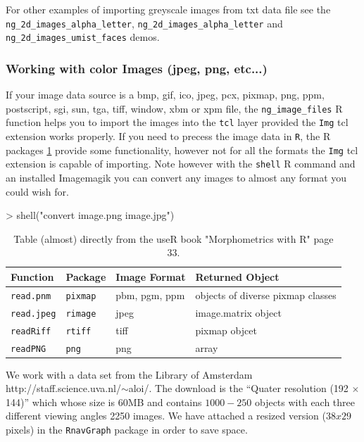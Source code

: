 \documentclass[12pt,oneside,titlepage,letter]{article}
\newcommand{\modify}[1]{{\color{blue}#1}}
\begin{document}
For other examples of importing greyscale images from txt data file see the \texttt{ng\_2d\_images\_alpha\_letter}, \texttt{ng\_2d\_images\_alpha\_letter} and \texttt{ng\_2d\_images\_umist\_faces} demos.


\subsubsection{Working with color Images (jpeg, png, etc...)}

If your image data source is a bmp, gif, ico, jpeg, pcx, pixmap, png, ppm, postscript, sgi, sun, tga, tiff, window, xbm or xpm file, the \texttt{ng\_image\_files} R function helps you to import the images into the \texttt{tcl} layer provided the \texttt{Img} tcl extension works properly. If you need to precess the image data in \texttt{R}, the R packages \ref{tab:ImagesInR} provide some functionality, however not for all the formats the \texttt{Img} tcl extension is capable of importing. Note however with the \texttt{shell} R command and an installed Imagemagik you can convert any images to almost any format you could wish for.\\
\begin{Schunk}
\begin{Sinput}
> shell("convert image.png image.jpg")
\end{Sinput}
\end{Schunk}

\begin{table}[h]
  \label{tab:ImagesInR}
  \centering
  \begin{tabular}{llll}
    \hline
    Function & Package & Image Format & Returned Object\\
    \hline
    \texttt{read.pnm} & \texttt{pixmap} & pbm, pgm, ppm & objects of diverse pixmap classes\\
    \texttt{read.jpeg} & \texttt{rimage} & jpeg & image.matrix object\\
    \texttt{readRiff} & \texttt{rtiff} & tiff & pixmap objcet\\
    \texttt{readPNG} & \texttt{png} & png & array\\
    \hline
  \end{tabular}    
  \caption{\modify{Table (almost) directly from the useR book "Morphometrics with R" page 33.}}
\end{table}


We work with a data set from the Library of Amsterdam \modify{http://staff.science.uva.nl/$\sim$aloi/}. The download is the ``Quater resolution (192 $\times$ 144)'' which whose size is 60MB and contains $1000-250$ objects with each three different viewing angles \modify{2250} images. We have attached a resized version ($38x29$ pixels) in the \texttt{RnavGraph} package in order to save space. 
\end{document}
